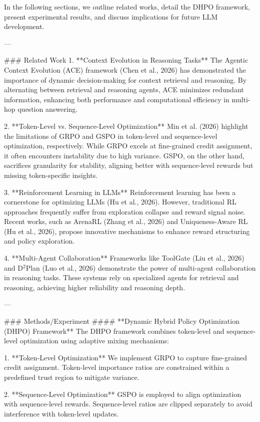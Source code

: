 In the following sections, we outline related works, detail the DHPO framework, present experimental results, and discuss implications for future LLM development.

---

### Related Work  
1. **Context Evolution in Reasoning Tasks**  
   The Agentic Context Evolution (ACE) framework (Chen et al., 2026) has demonstrated the importance of dynamic decision-making for context retrieval and reasoning. By alternating between retrieval and reasoning agents, ACE minimizes redundant information, enhancing both performance and computational efficiency in multi-hop question answering.

2. **Token-Level vs. Sequence-Level Optimization**  
   Min et al. (2026) highlight the limitations of GRPO and GSPO in token-level and sequence-level optimization, respectively. While GRPO excels at fine-grained credit assignment, it often encounters instability due to high variance. GSPO, on the other hand, sacrifices granularity for stability, aligning better with sequence-level rewards but missing token-specific insights.

3. **Reinforcement Learning in LLMs**  
   Reinforcement learning has been a cornerstone for optimizing LLMs (Hu et al., 2026). However, traditional RL approaches frequently suffer from exploration collapse and reward signal noise. Recent works, such as ArenaRL (Zhang et al., 2026) and Uniqueness-Aware RL (Hu et al., 2026), propose innovative mechanisms to enhance reward structuring and policy exploration.

4. **Multi-Agent Collaboration**  
   Frameworks like ToolGate (Liu et al., 2026) and D$^2$Plan (Luo et al., 2026) demonstrate the power of multi-agent collaboration in reasoning tasks. These systems rely on specialized agents for retrieval and reasoning, achieving higher reliability and reasoning depth.

---

### Methods/Experiment  
#### **Dynamic Hybrid Policy Optimization (DHPO) Framework**  
The DHPO framework combines token-level and sequence-level optimization using adaptive mixing mechanisms:

1. **Token-Level Optimization**  
   We implement GRPO to capture fine-grained credit assignment. Token-level importance ratios are constrained within a predefined trust region to mitigate variance.

2. **Sequence-Level Optimization**  
   GSPO is employed to align optimization with sequence-level rewards. Sequence-level ratios are clipped separately to avoid interference with token-level updates.

